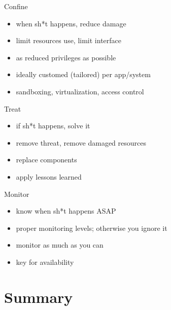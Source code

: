 \documentclass{curs}
\begin{document}
\begin{frame}{Confine}
  \begin{itemize}
    \item when sh*t happens, reduce damage
    \item limit resources use, limit interface
    \item as reduced privileges as possible
    \item ideally customed (tailored) per app/system
    \item sandboxing, virtualization, access control
  \end{itemize}
\end{frame}

\begin{frame}{Treat}
  \begin{itemize}
    \item if sh*t happens, solve it
    \item remove threat, remove damaged resources
    \item replace components
    \item apply lessons learned
  \end{itemize}
\end{frame}

\begin{frame}{Monitor}
  \begin{itemize}
    \item know when sh*t happens ASAP
    \item proper monitoring levels; otherwise you ignore it
    \item monitor as much as you can
    \item key for availability
  \end{itemize}
\end{frame}


\section{Summary}
\end{document}

